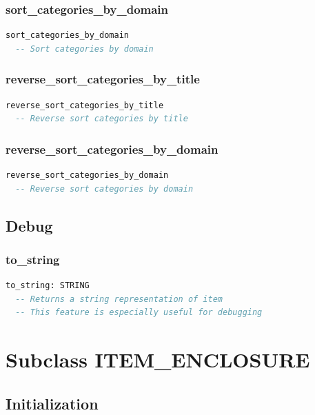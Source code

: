 \subsubsection{sort\_categories\_by\_domain}

\begin{lstlisting}[language=Eiffel]
sort_categories_by_domain
  -- Sort categories by domain
\end{lstlisting}

\subsubsection{reverse\_sort\_categories\_by\_title}

\begin{lstlisting}[language=Eiffel]
reverse_sort_categories_by_title
  -- Reverse sort categories by title
\end{lstlisting}

\subsubsection{reverse\_sort\_categories\_by\_domain}

\begin{lstlisting}[language=Eiffel]
reverse_sort_categories_by_domain
  -- Reverse sort categories by domain
\end{lstlisting}

\subsection{Debug}
\label{sec:item-debug}

\subsubsection{to\_string}

\begin{lstlisting}[language=Eiffel]
to_string: STRING
  -- Returns a string representation of item
  -- This feature is especially useful for debugging
\end{lstlisting}


\section{Subclass ITEM\_ENCLOSURE}
\label{sec:item-enclosure}

\subsection{Initialization}
\label{sec:item-enclosure-initialization}

